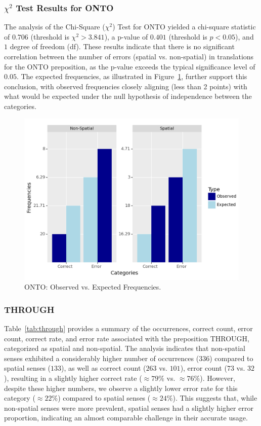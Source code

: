 \subsubsection{$\chi^2$ Test Results for ONTO} 

The analysis of the Chi-Square ($\chi^2$) Test for ONTO yielded a chi-square statistic of $0.706$ (threshold is  $\chi^2 > 3.841$), a p-value of $0.401$ (threshold is  $p < 0.05$), and $1$ degree of freedom (df). These results indicate that there is no significant correlation between the number of errors (spatial vs. non-spatial) in translations for the ONTO preposition, as the p-value exceeds the typical significance level of $0.05$. The expected frequencies, as illustrated in Figure~\ref{fig: schi-onto}, further support this conclusion, with observed frequencies closely aligning (less than 2 points) with what would be expected under the null hypothesis of independence between the categories.

\begin{figure}[htb]
        \centering
        \includegraphics[width=.8\textwidth]{textual/Figuras/Results/Unknown-67.png}
        \caption{ONTO: Observed vs. Expected Frequencies.}
        \label{fig: schi-onto}
\end{figure}


\subsubsection{THROUGH}

Table~\ref{tab:through} provides a summary of the occurrences, correct count, error count, correct rate, and error rate associated with the preposition THROUGH, categorized as spatial and non-spatial. The analysis indicates that non-spatial senses exhibited a considerably higher number of occurrences ($336$) compared to spatial senses ($133$), as well as correct count ($263$ vs. $101$), error count ($73$ vs. $32$), resulting in a slightly higher correct rate ($\approx79\%$ vs. $\approx76\%$). However, despite these higher numbers, we observe a slightly lower error rate for this category ($\approx22\%$) compared to spatial senses ($\approx24\%$). This suggests that, while non-spatial senses were more prevalent, spatial senses had a slightly higher error proportion, indicating an almost comparable challenge in their accurate usage.

